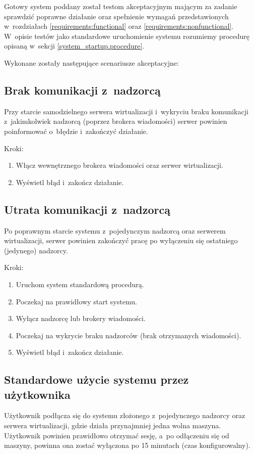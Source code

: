 \documentclass[../analiza-rozwiazania.tex]{subfiles}
\begin{document}
Gotowy system poddany został testom akceptacyjnym mającym za zadanie sprawdzić poprawne działanie oraz spełnienie wymagań przedstawionych w~rozdziałach \ref{requirements:functional} oraz \ref{requirements:nonfunctional}.
W~opisie testów jako standardowe uruchomienie systemu rozumiemy procedurę opisaną w~sekcji \ref{system_startup.procedure}.

Wykonane zostały następujące scenariusze akceptacyjne:

\subsection{Brak komunikacji z~nadzorcą}
Przy starcie samodzielnego serwera wirtualizacji i~wykryciu braku komunikacji z~jakimkolwiek nadzorcą (poprzez brokera wiadomości) serwer powinien poinformować o~błędzie i~zakończyć działanie.

Kroki:
\begin{enumerate}
  \item Włącz wewnętrznego brokera wiadomości oraz serwer wirtualizacji.
  \item Wyświetl błąd i~zakończ działanie.
\end{enumerate}

\subsection{Utrata komunikacji z~nadzorcą}
Po poprawnym starcie systemu z~pojedynczym nadzorcą oraz serwerem wirtualizacji, serwer powinien zakończyć pracę po wyłączeniu się ostatniego (jedynego) nadzorcy.

Kroki:
\begin{enumerate}
  \item Uruchom system standardową procedurą.
  \item Poczekaj na prawidłowy start systemu.
  \item Wyłącz nadzorcę lub brokery wiadomości.
  \item Poczekaj na wykrycie braku nadzorców (brak otrzymanych wiadomości).
  \item Wyświetl błąd i~zakończ działanie.
\end{enumerate}

\subsection{Standardowe użycie systemu przez użytkownika}
Użytkownik podłącza się do systemu złożonego z~pojedynczego nadzorcy oraz serwera wirtualizacji, gdzie działa przynajmniej jedna wolna maszyna.
Użytkownik powinien prawidłowo otrzymać sesję, a~po odłączeniu się od maszyny, powinna ona zostać wyłączona po 15 minutach (czas konfigurowalny).
\end{document}
